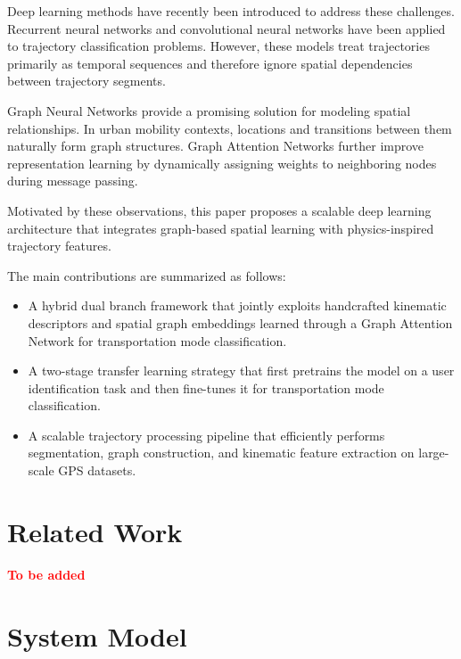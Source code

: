 \documentclass[conference]{IEEEtran}
\begin{document}
Deep learning methods have recently been introduced to address these challenges. Recurrent neural networks and convolutional neural networks have been applied to trajectory classification problems. However, these models treat trajectories primarily as temporal sequences and therefore ignore spatial dependencies between trajectory segments.

Graph Neural Networks provide a promising solution for modeling spatial relationships. In urban mobility contexts, locations and transitions between them naturally form graph structures. Graph Attention Networks further improve representation learning by dynamically assigning weights to neighboring nodes during message passing.

Motivated by these observations, this paper proposes a scalable deep learning architecture that integrates graph-based spatial learning with physics-inspired trajectory features.

The main contributions are summarized as follows:

\begin{itemize}

\item A hybrid dual branch framework that jointly exploits handcrafted kinematic descriptors and spatial graph embeddings learned through a Graph Attention Network for transportation mode classification.

\item A two-stage transfer learning strategy that first pretrains the model on a user identification task and then fine-tunes it for transportation mode classification.

\item A scalable trajectory processing pipeline that efficiently performs segmentation, graph construction, and kinematic feature extraction on large-scale GPS datasets.
\end{itemize}

\section{Related Work}

\textbf{\textcolor{red}{To be added}}

\section{System Model}
\label{sec:sysmodel}

\end{document}
